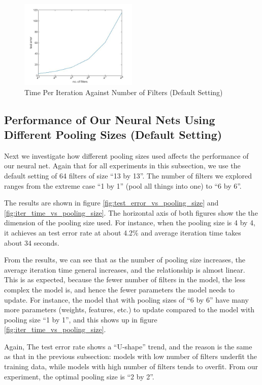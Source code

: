\documentclass[10pt,twocolumn]{article}
\begin{document}
\begin{figure}
\centering
\includegraphics[width = 0.5\textwidth]{figure/iter_time_vs_no_of_filters}
\caption{Time Per Iteration Against Number of Filters (Default Setting)}
\label{fig:iter_time_vs_no_of_filters}
\end{figure}

\subsection{Performance of Our Neural Nets Using Different Pooling Sizes (Default Setting)}

Next we investigate how different pooling sizes used affects the performance of our neural net. Again that for all experiments in this subsection, we use the default setting of 64 filters of size ``13 by 13''. The number of filters we explored ranges from the extreme case ``1 by 1'' (pool all things into one) to ``6 by 6''.

The results are shown in figure \ref{fig:test_error_vs_pooling_size} and \ref{fig:iter_time_vs_pooling_size}. The horizontal axis of both figures show the the dimension of the pooling size used. For instance, when the pooling size is 4 by 4, it achieves an test error rate at about 4.2\% and average iteration time takes about 34 seconds.

From the results, we can see that as the number of pooling size increases, the average iteration time general increases, and the relationship is almost linear. This is as expected, because the fewer number of filters in the model, the less complex the model is, and hence the fewer parameters the model needs to update. For instance, the model that with pooling sizes of ``6 by 6'' have many more parameters (weights, features, etc.) to update compared to the model with pooling size ``1 by 1'', and this shows up in figure \ref{fig:iter_time_vs_pooling_size}.

Again, The test error rate shows a ``U-shape'' trend, and the reason is the same as that in the previous subsection: models with low number of filters underfit the training data, while models with high number of filters tends to overfit. From our experiment, the optimal pooling size is ``2 by 2''.
\end{document}
